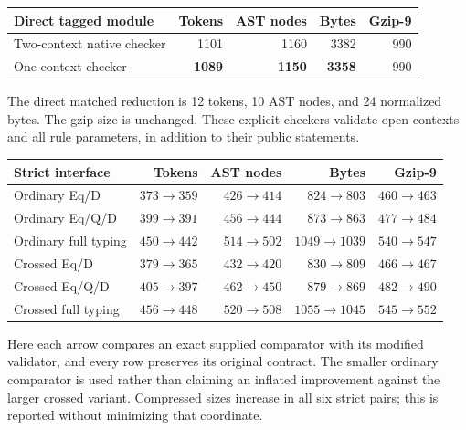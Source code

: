\begin{center}
\small
\begin{tabular}{@{}lrrrr@{}}
\toprule
Direct tagged module & Tokens & AST nodes & Bytes & Gzip-9\\
\midrule
Two-context native checker & 1101 & 1160 & 3382 & 990\\
One-context checker & \textbf{1089} & \textbf{1150} & \textbf{3358} & 990\\
\bottomrule
\end{tabular}
\end{center}
The direct matched reduction is 12 tokens, 10 AST nodes, and 24 normalized
bytes. The gzip size is unchanged. These explicit checkers validate open
contexts and all rule parameters, in addition to their public statements.

\begin{center}
\small
\begin{tabular}{@{}lrrrr@{}}
\toprule
Strict interface & Tokens & AST nodes & Bytes & Gzip-9\\
\midrule
Ordinary Eq/D & $373\to359$ & $426\to414$ & $824\to803$ & $460\to463$\\
Ordinary Eq/Q/D & $399\to391$ & $456\to444$ & $873\to863$ & $477\to484$\\
Ordinary full typing & $450\to442$ & $514\to502$ & $1049\to1039$ & $540\to547$\\
Crossed Eq/D & $379\to365$ & $432\to420$ & $830\to809$ & $466\to467$\\
Crossed Eq/Q/D & $405\to397$ & $462\to450$ & $879\to869$ & $482\to490$\\
Crossed full typing & $456\to448$ & $520\to508$ & $1055\to1045$ & $545\to552$\\
\bottomrule
\end{tabular}
\end{center}
Here each arrow compares an exact supplied comparator with its modified
validator, and every row preserves its original contract. The smaller
ordinary comparator is used rather than claiming an inflated improvement
against the larger crossed variant. Compressed sizes increase in all six
strict pairs; this is reported without minimizing that coordinate.
